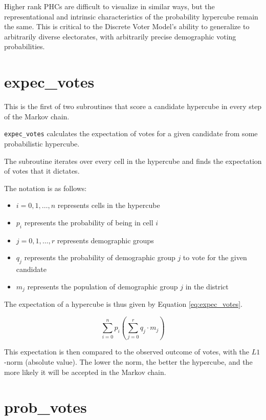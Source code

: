 Higher rank PHCs are difficult to visualize in similar ways, but the representational and intrinsic characteristics of the probability hypercube remain the same. This is critical to the Discrete Voter Model's ability to generalize to arbitrarily diverse electorates, with arbitrarily precise demographic voting probabilities.


\section{expec\_votes}

This is the first of two subroutines that score a candidate hypercube in every step of the Markov chain.

\texttt{expec\_votes} calculates the expectation of votes for a given candidate from some probabilistic hypercube.

The subroutine iterates over every cell in the hypercube and finds the expectation of votes that it dictates.

The notation is as follows:

\begin{itemize}
  \item $i = 0, 1, \dots, n$ represents cells in the hypercube
  \item $p_i$ represents the probability of being in cell $i$
  \item $j = 0, 1, \dots, r$ represents demographic groups
  \item $q_j$ represents the probability of demographic group $j$ to vote for the given candidate
  \item $m_j$ represents the population of demographic group $j$ in the district
\end{itemize}

The expectation of a hypercube is thus given by Equation \ref{eq:expec_votes}.

\begin{equation}
 \sum_{i = 0}^n p_i \left(\sum_{j = 0}^r q_j \cdot m_j\right)
 \label{eq:expec_votes}
\end{equation}

This expectation is then compared to the observed outcome of votes, with the $L1$-norm (absolute value). The lower the norm, the better the hypercube, and the more likely it will be accepted in the Markov chain.


\section{prob\_votes}

